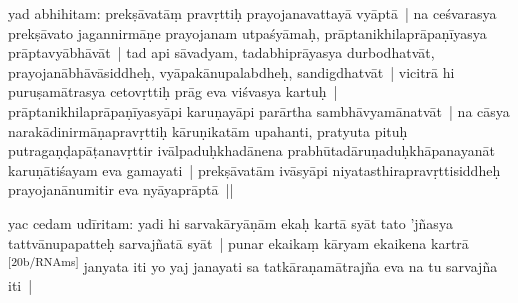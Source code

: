 \documentclass[article,a4paper]{memoir}
\begin{document}
	  \pstart yad abhihitam: \label{nk_3522_start}prekṣā\-vatā\-ṃ pravṛttiḥ prayojanavattayā\- vyā\-ptā\- | na ceśvarasya prekṣā\-vato jagannirmā\-ṇe prayojanam utpaśyā\-maḥ, prā\-ptanikhilaprā\-paṇī\-yasya prā\-ptavyā\-bhā\-vā\-t |\label{nk_3522_end} tad api sā\-vadyam, tadabhiprā\-yasya durbodhatvā\-t, prayojanā\-bhā\-vā\-siddheḥ, vyā\-pakā\-nupalabdheḥ, sandigdhatvā\-t | vicitrā\- hi puruṣamā\-trasya cetovṛttiḥ prā\-g eva viśvasya kartuḥ | prā\-ptanikhilaprā\-paṇī\-yasyā\-pi karuṇayā\-pi parā\-rtha sambhā\-vyamā\-natvā\-t | na cā\-sya narakā\-dinirmā\-ṇapravṛttiḥ kā\-ruṇikatā\-m upahanti, pratyuta pituḥ putragaṇḍapā\-ṭanavṛttir ivā\-lpaduḥkhadā\-nena prabhū\-tadā\-ruṇaduḥkhā\-panayanā\-t karuṇā\-tiśayam eva gamayati | prekṣā\-vatā\-m ivā\-syā\-pi niyatasthirapravṛttisiddheḥ prayojanā\-numitir eva nyā\-yaprā\-ptā\- ||
	\pend
      

	  \pstart yac cedam udī\-ritam: yadi hi sarvakā\-ryā\-ṇā\-m ekaḥ kartā\- syā\-t tato 'jñasya tattvā\-nupapatteḥ sarvajñatā\- syā\-t |  punar ekaikaṃ kā\-ryam ekaikena kartrā\- \leavevmode\textsuperscript{\rmlatinfont\tiny [20b/RNAms]}\label{RNAms_20b} janyata iti yo yaj janayati sa tatkā\-raṇamā\-trajña eva na tu sarvajña iti |
	\pend
      
\end{document}
